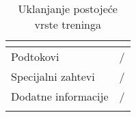 \documentclass[../main.tex]{subfiles}
\begin{document}
\begin{longtable}{| p{} | p{} |}
\begin{itemize}
    \end{itemize}\\
\hline
    Podtokovi & /\\
\hline
    Specijalni zahtevi & /\\
\hline
    Dodatne informacije & /\\
\hline
\caption{Uklanjanje postojeće vrste treninga} %
\end{longtable}
\end{document}
